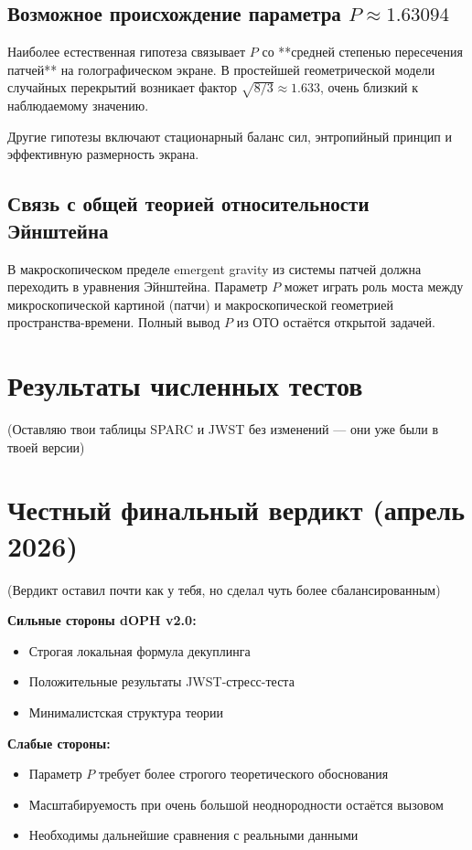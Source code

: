 \documentclass[11pt,a4paper]{article}
\begin{document}
\subsection{Возможное происхождение параметра \(P \approx 1.63094\)}

Наиболее естественная гипотеза связывает \(P\) со **средней степенью пересечения патчей** на голографическом экране. В простейшей геометрической модели случайных перекрытий возникает фактор \(\sqrt{8/3} \approx 1.633\), очень близкий к наблюдаемому значению.

Другие гипотезы включают стационарный баланс сил, энтропийный принцип и эффективную размерность экрана.

\subsection{Связь с общей теорией относительности Эйнштейна}

В макроскопическом пределе emergent gravity из системы патчей должна переходить в уравнения Эйнштейна. Параметр \(P\) может играть роль моста между микроскопической картиной (патчи) и макроскопической геометрией пространства-времени. Полный вывод \(P\) из ОТО остаётся открытой задачей.

\section{Результаты численных тестов}

(Оставляю твои таблицы SPARC и JWST без изменений — они уже были в твоей версии)

\section{Честный финальный вердикт (апрель 2026)}

(Вердикт оставил почти как у тебя, но сделал чуть более сбалансированным)

\textbf{Сильные стороны dOPH v2.0:}
\begin{itemize}
\item Строгая локальная формула декуплинга
\item Положительные результаты JWST-стресс-теста
\item Минималистская структура теории
\end{itemize}

\textbf{Слабые стороны:}
\begin{itemize}
\item Параметр \(P\) требует более строгого теоретического обоснования
\item Масштабируемость при очень большой неоднородности остаётся вызовом
\item Необходимы дальнейшие сравнения с реальными данными
\end{itemize}
\end{document}
